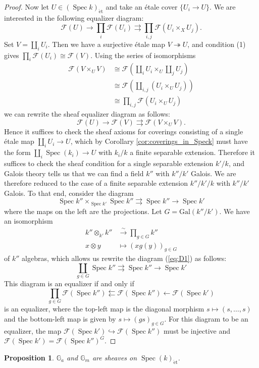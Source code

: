 \documentclass{article}
\def\~#1{\mathscr{#1}}
\numberwithin{equation}{section}
\numberwithin{figure}{section}
\newcommand{\G}{\mathbb{G}}
\newcommand{\isom}{\xrightarrow{\sim}}
\newcommand{\epi}{\twoheadrightarrow}
\newcommand{\mono}{\hookrightarrow}
\newcommand{\Spec}{\mathop{\mathrm{Spec}}}
\newcommand{\et}{\acute{\mathrm{e}}\mathrm{t}}
\newcommand{\Gal}{\mathrm{Gal}}
\theoremstyle{plain}
\newtheorem{prop}[thm]{Proposition}
\theoremstyle{definition}
\theoremstyle{remark}
\begin{document}
\begin{proof}
Now let $U \in (\Spec{k})_{\et}$ and take an \'etale cover $\{U_i \to U\}$. We are interested in the following equalizer diagram:
\[\~F(U) \to \prod_i \~F(U_i) \rightrightarrows \prod_{i,j} \~F(U_i \times_X U_j).\]
Set $V = \coprod_i U_i$. Then we have a surjective \'etale map $V \epi U$, and condition (1) gives $\prod_i \~F(U_i) \cong \~F(V)$. Using the series of isomorphisms
\begin{align*}
\~F(V \times_U V) &\cong \~F\left(\coprod_{i}U_i \times_U \coprod_{j}U_j\right) \\ 
&\cong \~F\left(\coprod_{i,j} (U_i \times_U U_j)\right) \\ 
&\cong \prod_{i,j} \~F(U_i \times_U U_j)
\end{align*}
we can rewrite the sheaf equalizer diagram as follows:
\[\~F(U) \to \~F\left(V\right) \rightrightarrows \~F(V \times_U V).\]
Hence it suffices to check the sheaf axioms for coverings consisting of a single \'etale map $\coprod_i U_i \to U$, which by Corollary \ref{cor:coverings_in_Speck} must have the form $\coprod_{i} \Spec(k_i) \to U$ with $k_{i}/k$ a finite separable extension. Therefore it suffices to check the sheaf condition for a single separable extension $k'/k$, and Galois theory tells us that we can find a field $k''$ with $k''/k'$ Galois. We are therefore reduced to the case of a finite separable extension $k''/k'/k$ with $k''/k'$ Galois. To that end, consider the diagram
\begin{equation}\label{eq:D1}\Spec{k''} \times_{\Spec{k'}} \Spec{k''} \rightrightarrows \Spec{k''} \to \Spec{k'}\end{equation}
where the maps on the left are the projections. Let $G = \Gal(k''/k')$. We have an isomorphism
\begin{align*} 
k'' \otimes_{k'} k'' &\isom \prod_{g \in G} k'' \\
x \otimes y &\mapsto (xg(y))_{g \in G}
\end{align*}
of $k''$ algebras, which allows us rewrite the diagram (\ref{eq:D1}) as follows:
\begin{equation}\label{eq:D2}\coprod_{g \in G} \Spec{k''} \rightrightarrows \Spec{k''} \to \Spec{k'}\end{equation}
This diagram is an equalizer if and only if 
\begin{equation}\prod_{g \in G} \~F(\Spec{k''}) \leftleftarrows \~F(\Spec{k''}) \leftarrow \~F(\Spec{k'})\end{equation}
is an equalizer, where the top-left map is the diagonal morphism $s \mapsto (s, \hdots, s)$ and the bottom-left map is given by $s \mapsto (gs)_{g \in G}$. For this diagram to be an equalizer, the map $\~F(\Spec{k'}) \mono  \~F(\Spec{k''})$ must be injective and $\~F(\Spec{k'}) = \~F(\Spec{k''})^G$.
\end{proof}
\begin{prop}
    $\G_a$ and $\G_m$ are sheaves on $\Spec(k)_{\et}$. 
\end{prop}
\end{document}
